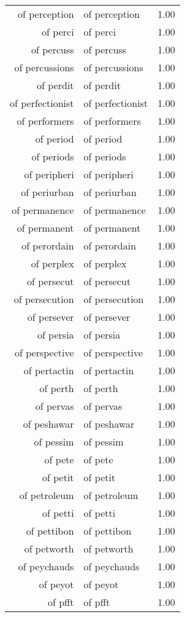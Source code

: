 \begin{table}[ht]
\begin{tabular}{rlr}
  of perception & of perception & 1.00 \\ 
  of perci & of perci & 1.00 \\ 
  of percuss & of percuss & 1.00 \\ 
  of percussions & of percussions & 1.00 \\ 
  of perdit & of perdit & 1.00 \\ 
  of perfectionist & of perfectionist & 1.00 \\ 
  of performers & of performers & 1.00 \\ 
  of period & of period & 1.00 \\ 
  of periods & of periods & 1.00 \\ 
  of peripheri & of peripheri & 1.00 \\ 
  of periurban & of periurban & 1.00 \\ 
  of permanence & of permanence & 1.00 \\ 
  of permanent & of permanent & 1.00 \\ 
  of perordain & of perordain & 1.00 \\ 
  of perplex & of perplex & 1.00 \\ 
  of persecut & of persecut & 1.00 \\ 
  of persecution & of persecution & 1.00 \\ 
  of persever & of persever & 1.00 \\ 
  of persia & of persia & 1.00 \\ 
  of perspective & of perspective & 1.00 \\ 
  of pertactin & of pertactin & 1.00 \\ 
  of perth & of perth & 1.00 \\ 
  of pervas & of pervas & 1.00 \\ 
  of peshawar & of peshawar & 1.00 \\ 
  of pessim & of pessim & 1.00 \\ 
  of pete & of pete & 1.00 \\ 
  of petit & of petit & 1.00 \\ 
  of petroleum & of petroleum & 1.00 \\ 
  of petti & of petti & 1.00 \\ 
  of pettibon & of pettibon & 1.00 \\ 
  of petworth & of petworth & 1.00 \\ 
  of peychauds & of peychauds & 1.00 \\ 
  of peyot & of peyot & 1.00 \\ 
  of pfft & of pfft & 1.00 \\ 

\end{tabular}
\end{table}
